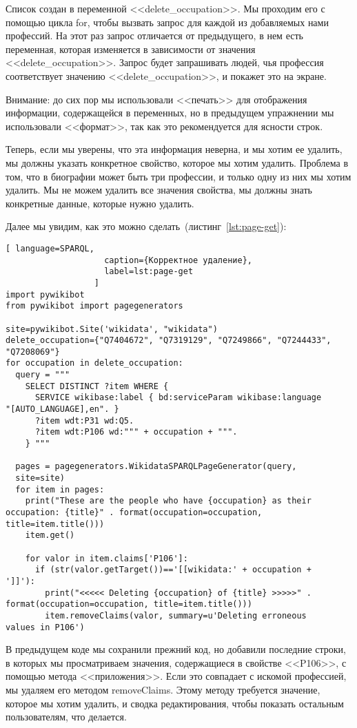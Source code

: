 Список создан в переменной <<delete\_occupation>>. Мы проходим его с помощью цикла for, чтобы вызвать запрос для каждой из добавляемых нами профессий. На этот раз запрос отличается от предыдущего, в нем есть переменная, которая изменяется в зависимости от значения <<delete\_occupation>>. Запрос будет запрашивать людей, чья профессия соответствует значению <<delete\_occupation>>, и покажет это на экране.

Внимание: до сих пор мы использовали <<печать>> для отображения информации, содержащейся в переменных, но в предыдущем упражнении мы использовали <<формат>>, так как это рекомендуется для ясности строк.

Теперь, если мы уверены, что эта информация неверна, и мы хотим ее удалить, мы должны указать конкретное свойство, которое мы хотим удалить. Проблема в том, что в биографии может быть три профессии, и только одну из них мы хотим удалить. Мы не можем удалить все значения свойства, мы должны знать конкретные данные, которые нужно удалить.

Далее мы увидим, как это можно сделать~(листинг~\ref{lst:page-get}):

\begin{lstlisting}[ language=SPARQL,
                    caption={Корректное удаление},
                    label=lst:page-get
                  ]
import pywikibot
from pywikibot import pagegenerators

site=pywikibot.Site('wikidata', "wikidata")
delete_occupation={"Q7404672", "Q7319129", "Q7249866", "Q7244433", 
"Q7208069"}
for occupation in delete_occupation:
  query = """
    SELECT DISTINCT ?item WHERE {
      SERVICE wikibase:label { bd:serviceParam wikibase:language 
"[AUTO_LANGUAGE],en". }
      ?item wdt:P31 wd:Q5.
      ?item wdt:P106 wd:""" + occupation + """.
    } """

  pages = pagegenerators.WikidataSPARQLPageGenerator(query, 
  site=site)
  for item in pages:
    print("These are the people who have {occupation} as their 
occupation: {title}" . format(occupation=occupation, 
title=item.title()))
    item.get()

    for valor in item.claims['P106']:
      if (str(valor.getTarget())=='[[wikidata:' + occupation + 
']]'):
        print("<<<<< Deleting {occupation} of {title} >>>>>" . 
format(occupation=occupation, title=item.title()))
        item.removeClaims(valor, summary=u'Deleting erroneous 
values in P106')
\end{lstlisting} 

В предыдущем коде мы сохранили прежний код, но добавили последние строки, в которых мы просматриваем значения, содержащиеся в свойстве <<P106>>, с помощью метода <<приложения>>. Если это совпадает с искомой профессией, мы удаляем его методом removeClaims. Этому методу требуется значение, которое мы хотим удалить, и сводка редактирования, чтобы показать остальным пользователям, что делается.

